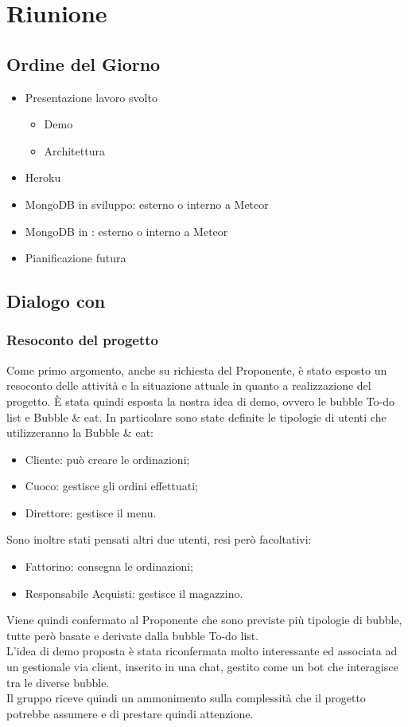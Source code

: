 \section{Riunione}
\subsection{Ordine del Giorno}
\begin{itemize}
	\item Presentazione lavoro svolto
	\begin{itemize}
		\item Demo
		\item Architettura
	\end{itemize}
	\item Heroku
	\item MongoDB in sviluppo: esterno o interno a Meteor
	\item MongoDB in : esterno o interno a Meteor
	\item Pianificazione futura
\end{itemize}

\subsection{Dialogo con \Proponente}
\subsubsection{Resoconto del progetto}
Come primo argomento, anche su richiesta del Proponente, è stato esposto un resoconto delle attività e la situazione attuale in quanto a realizzazione del progetto. È stata quindi esposta la nostra idea di demo, ovvero le bubble To-do list e Bubble \& eat. In particolare sono state definite le tipologie di utenti che utilizzeranno la Bubble \& eat:
\begin{itemize}
	\item Cliente: può creare le ordinazioni;
	\item Cuoco: gestisce gli ordini effettuati;
	\item Direttore: gestisce il menu.
\end{itemize}
Sono inoltre stati pensati altri due utenti, resi però facoltativi:
\begin{itemize}
	\item Fattorino: consegna le ordinazioni;
	\item Responsabile Acquisti: gestisce il magazzino.
\end{itemize}
Viene quindi confermato al Proponente che sono previste più tipologie di bubble, tutte però basate e derivate dalla bubble To-do list.\\
L'idea di demo proposta è stata riconfermata molto interessante ed associata ad un gestionale via client, inserito in una chat, gestito come un bot che interagisce tra le diverse bubble.\\
Il gruppo riceve quindi un ammonimento sulla complessità che il progetto potrebbe assumere e di prestare quindi attenzione.

